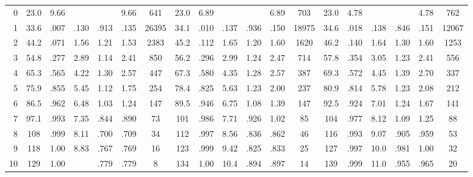 \begin{table}[h]
\begin{tiny}
\begin{tabular}{r|CCCCCC|CCCCCC|CCCCCC}
        0   & 23.0  & 9.66     & \cc{\textemdash}       & \cc{\textemdash}       & 9.66      & 641   & 23.0  & 6.89     & \cc{\textemdash}       & \cc{\textemdash}       & 6.89      & 703    & 23.0  & 4.78     & \cc{\textemdash}       & \cc{\textemdash}       & 4.78      & 762      \\
        1   & 33.6  & .007     & .130     & .913     & .135     & 26395 & 34.1  & .010     & .137     & .936     & .150      & 18975  & 34.6  & .018     & .138     & .846     & .151     & 12067    \\
        2   & 44.2  & .071     & 1.56      & 1.21      & 1.53      & 2383  & 45.2  & .112     & 1.65      & 1.20      & 1.60      & 1620   & 46.2  & .140     & 1.64      & 1.30      & 1.60      & 1253     \\
        3   & 54.8  & .277     & 2.89      & 1.14      & 2.41      & 850   & 56.2  & .296     & 2.99      & 1.24      & 2.47      & 714    & 57.8  & .354     & 3.05      & 1.23      & 2.41      & 556      \\
        4   & 65.3  & .565     & 4.22      & 1.30      & 2.57      & 447   & 67.3  & .580     & 4.35      & 1.28      & 2.57      & 387    & 69.3  & .572     & 4.45      & 1.39      & 2.70      & 337      \\
        5   & 75.9  & .855     & 5.45      & 1.12      & 1.75      & 254   & 78.4  & .825     & 5.63      & 1.23      & 2.00      & 237    & 80.9  & .814     & 5.78      & 1.23      & 2.08      & 212      \\
        6   & 86.5  & .962     & 6.48      & 1.03      & 1.24      & 147   & 89.5  & .946     & 6.75      & 1.08      & 1.39      & 147    & 92.5  & .924     & 7.01      & 1.24      & 1.67      & 141      \\
        7   & 97.1  & .993     & 7.35      & .844     & .890     & 73    & 101   & .986     & 7.71      & .926     & 1.02      & 85     & 104   & .977     & 8.12      & 1.09      & 1.25      & 88       \\
        8   & 108   & .999     & 8.11      & .700     & .709     & 34    & 112   & .997     & 8.56      & .836     & .862     & 46     & 116   & .993     & 9.07      & .905     & .959     & 53       \\
        9   & 118   & 1.00     & 8.83      & .767     & .769     & 16    & 123   & .999     & 9.42      & .825     & .833     & 25     & 127   & .997     & 10.0      & .981     & 1.00      & 32       \\
        10  & 129   & 1.00      & \cc{\textemdash}       & .779     & .779     & 8     & 134   & 1.00      & 10.4      & .894     & .897     & 14     & 139   & .999     & 11.0      & .955     & .965     & 20       \\

\end{tabular}
\end{tiny}
\end{table}
